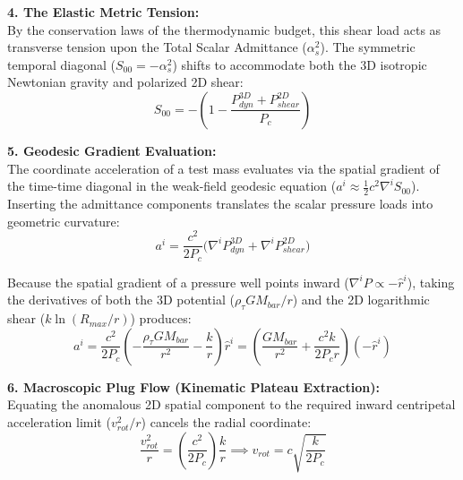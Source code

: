 \textbf{4. The Elastic Metric Tension:} \\ 
By the conservation laws of the thermodynamic budget, this shear load acts as transverse tension upon the Total Scalar Admittance ($\alpha_s^2$). The symmetric temporal diagonal ($S_{00} = -\alpha_s^2$) shifts to accommodate both the 3D isotropic Newtonian gravity and polarized 2D shear:
\begin{equation}
    S_{00} = -\left( 1 - \frac{P_{dyn}^{3D} + P_{shear}^{2D}}{P_c} \right) \label{eq:modified_temporal_diagonal}
\end{equation}

\textbf{5. Geodesic Gradient Evaluation:} \\
The coordinate acceleration of a test mass evaluates via the spatial gradient of the time-time diagonal in the weak-field geodesic equation ($a^i \approx \frac{1}{2}c^2 \nabla^i S_{00}$). Inserting the admittance components translates the scalar pressure loads into geometric curvature:
\begin{equation}
    a^i = \frac{c^2}{2 P_c} \big( \nabla^i P_{dyn}^{3D} + \nabla^i P_{shear}^{2D} \big) %
\end{equation}

Because the spatial gradient of a pressure well points inward ($\nabla^i P \propto - \hat{r}^i$), taking the derivatives of both the 3D potential ($\rho_\tau GM_{bar}/r$) and the 2D logarithmic shear ($k \ln(R_{max}/r)$) produces: %
\begin{equation}
    a^i = \frac{c^2}{2 P_c} \left( -\frac{\rho_\tau G M_{bar}}{r^2} - \frac{k}{r} \right) \hat{r}^i = \left( \frac{G M_{bar}}{r^2} + \frac{c^2 k}{2 P_c r} \right) (-\hat{r}^i) %
\end{equation}

\vspace{0.2 cm}

\textbf{6. Macroscopic Plug Flow (Kinematic Plateau Extraction):} \\ 
Equating the anomalous 2D spatial component to the required inward centripetal acceleration limit ($v_{rot}^2/r$) cancels the radial coordinate:
\begin{equation}
    \frac{v_{rot}^2}{r} = \left( \frac{c^2}{2 P_c} \right) \frac{k}{r} \implies v_{rot} = c \sqrt{ \frac{k}{2 P_c} } \label{eq:plug_flow_plateau}
\end{equation}

